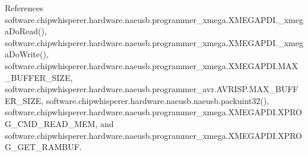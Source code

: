 References software.\+chipwhisperer.\+hardware.\+naeusb.\+programmer\+\_\+xmega.\+X\+M\+E\+G\+A\+P\+D\+I.\+\_\+xmega\+Do\+Read(), software.\+chipwhisperer.\+hardware.\+naeusb.\+programmer\+\_\+xmega.\+X\+M\+E\+G\+A\+P\+D\+I.\+\_\+xmega\+Do\+Write(), software.\+chipwhisperer.\+hardware.\+naeusb.\+programmer\+\_\+xmega.\+X\+M\+E\+G\+A\+P\+D\+I.\+M\+A\+X\+\_\+\+B\+U\+F\+F\+E\+R\+\_\+\+S\+I\+Z\+E, software.\+chipwhisperer.\+hardware.\+naeusb.\+programmer\+\_\+avr.\+A\+V\+R\+I\+S\+P.\+M\+A\+X\+\_\+\+B\+U\+F\+F\+E\+R\+\_\+\+S\+I\+Z\+E, software.\+chipwhisperer.\+hardware.\+naeusb.\+naeusb.\+packuint32(), software.\+chipwhisperer.\+hardware.\+naeusb.\+programmer\+\_\+xmega.\+X\+M\+E\+G\+A\+P\+D\+I.\+X\+P\+R\+O\+G\+\_\+\+C\+M\+D\+\_\+\+R\+E\+A\+D\+\_\+\+M\+E\+M, and software.\+chipwhisperer.\+hardware.\+naeusb.\+programmer\+\_\+xmega.\+X\+M\+E\+G\+A\+P\+D\+I.\+X\+P\+R\+O\+G\+\_\+\+G\+E\+T\+\_\+\+R\+A\+M\+B\+U\+F.


